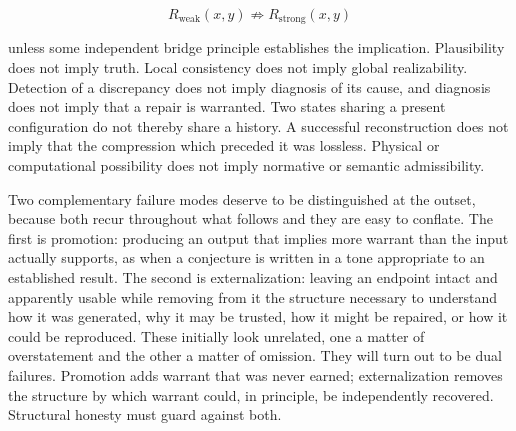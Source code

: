 \documentclass[11pt]{article}
\begin{document}
\[
R_{\mathrm{weak}}(x,y) \not\Rightarrow R_{\mathrm{strong}}(x,y)
\]

unless some independent bridge principle establishes the implication. Plausibility does not imply truth. Local consistency does not imply global realizability. Detection of a discrepancy does not imply diagnosis of its cause, and diagnosis does not imply that a repair is warranted. Two states sharing a present configuration do not thereby share a history. A successful reconstruction does not imply that the compression which preceded it was lossless. Physical or computational possibility does not imply normative or semantic admissibility.

Two complementary failure modes deserve to be distinguished at the outset, because both recur throughout what follows and they are easy to conflate. The first is promotion: producing an output that implies more warrant than the input actually supports, as when a conjecture is written in a tone appropriate to an established result. The second is externalization: leaving an endpoint intact and apparently usable while removing from it the structure necessary to understand how it was generated, why it may be trusted, how it might be repaired, or how it could be reproduced. These initially look unrelated, one a matter of overstatement and the other a matter of omission. They will turn out to be dual failures. Promotion adds warrant that was never earned; externalization removes the structure by which warrant could, in principle, be independently recovered. Structural honesty must guard against both.
\end{document}
